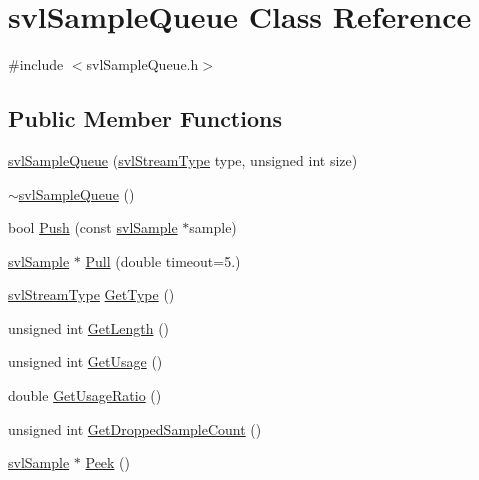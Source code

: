 \hypertarget{classsvl_sample_queue}{\section{svl\-Sample\-Queue Class Reference}
\label{classsvl_sample_queue}
}


{\ttfamily \#include $<$svl\-Sample\-Queue.\-h$>$}

\subsection*{Public Member Functions}
\begin{DoxyCompactItemize}
\item 
\hyperlink{classsvl_sample_queue_a4886a27d8f75834e6bd60c24cf1907a4}{svl\-Sample\-Queue} (\hyperlink{svl_definitions_8h_aa00696d338a58db361335a01fd11e122}{svl\-Stream\-Type} type, unsigned int size)
\item 
\hyperlink{classsvl_sample_queue_a13e9cfdf1405c2c6aff5b5ba75d7119f}{$\sim$svl\-Sample\-Queue} ()
\item 
bool \hyperlink{classsvl_sample_queue_a35d3a585cc0a7dba64d32b94c14d6d7b}{Push} (const \hyperlink{classsvl_sample}{svl\-Sample} $\ast$sample)
\item 
\hyperlink{classsvl_sample}{svl\-Sample} $\ast$ \hyperlink{classsvl_sample_queue_a97403e218a8492f3fd942ebe36b64154}{Pull} (double timeout=5.)
\item 
\hyperlink{svl_definitions_8h_aa00696d338a58db361335a01fd11e122}{svl\-Stream\-Type} \hyperlink{classsvl_sample_queue_ab20419409ec77dd88b7c8688c56533c3}{Get\-Type} ()
\item 
unsigned int \hyperlink{classsvl_sample_queue_a1d14fefe5d0e874803aed6c4dbb2fd3b}{Get\-Length} ()
\item 
unsigned int \hyperlink{classsvl_sample_queue_afd06dad677a561c09b93331512eef86f}{Get\-Usage} ()
\item 
double \hyperlink{classsvl_sample_queue_a2c8cd815df98f2a4d8af8fe90c38be01}{Get\-Usage\-Ratio} ()
\item 
unsigned int \hyperlink{classsvl_sample_queue_a9008f1724bf2f9658afbbb6757347fed}{Get\-Dropped\-Sample\-Count} ()
\item 
\hyperlink{classsvl_sample}{svl\-Sample} $\ast$ \hyperlink{classsvl_sample_queue_ab13f89e8d39231c530b1a970cb472db5}{Peek} ()
\end{DoxyCompactItemize}


